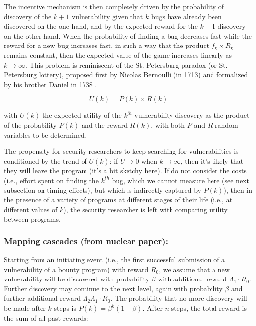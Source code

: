 The incentive mechanism is then completely driven by the probability of discovery of the $k+1$ vulnerability given that $k$ bugs have already been discovered on the one hand, and by the expected reward for the $k+1$ discovery on the other hand. When the probability of finding a bug decreases fast while the reward for a new bug increases fast, in such a way that the product $f_k \times R_k$ remains constant, then the expected value of the game increases linearly as $k \rightarrow \infty$. This problem is reminiscent of the St. Petersburg paradox (or St. Petersburg lottery), proposed first by Nicolas Bernoulli (in 1713)  and formalized by his brother Daniel in 1738 \cite{}.

\begin{equation}
\label{ }
U(k) = P(k) \times R(k)
\end{equation}

with $U(k)$ the expected utility of the $k^{th}$ vulnerability discovery as the product of the probability $P(k)$ and the reward $R(k)$, with both $P$ and $R$ random variables to be determined.

The propensity for security researchers to keep searching for vulnerabilities is conditioned by the trend of $U(k)$: if $U \rightarrow 0$ when $k \rightarrow \infty$, then it's likely that they will leave the program (it's a bit sketchy here). If do not consider the costs (i.e., effort spent on finding the $k^{th}$ bug, which we cannot measure here (see next subsection on timing effects), but which is indirectly captured by $P(k)$), then in the presence of a variety of programs at different stages of their life (i.e., at different values of $k$), the security researcher is left with comparing utility between programs.


\subsubsection{Mapping cascades (from nuclear paper):}

Starting from an initiating event (i.e., the first successful submission of a vulnerability of a bounty program) with reward $R_{0}$, we assume that a new vulnerability will be discovered with probability $\beta$ with additional reward $\Lambda_1 \cdot R_{0}$. Further discovery  may continue to the next level, again with 
probability $\beta$ and further additional reward $ \Lambda_2 \Lambda_1 \cdot R_{0}$. The probability that no more discovery will be made after $k$ steps is $P(k) = \beta^{k} (1-\beta)$. After $n$ steps, the total reward is the sum of all past rewards: 

